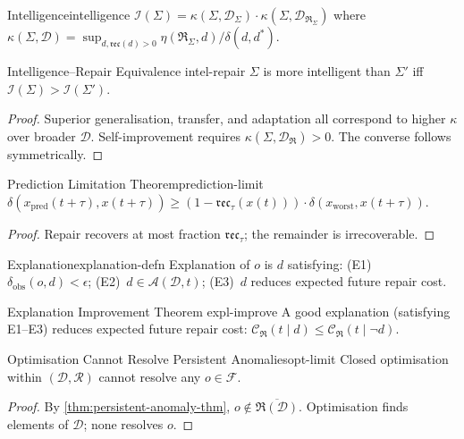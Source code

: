 \documentclass[12pt,twoside,openright]{book}
\newcommand{\adm}{\mathcal{A}}
\newcommand{\repair}{\mathfrak{R}}
\newcommand{\reco}{\mathfrak{rec}}
\begin{document}
\begin{definition}{Intelligence}{intelligence}
  $\mathcal{I}(\Sigma)
  =\kappa(\Sigma,\mathcal{D}_\Sigma)
  \cdot\kappa(\Sigma,\mathcal{D}_{\repair_\Sigma})$
  where $\kappa(\Sigma,\mathcal{D})
  =\sup_{d,\reco(d)>0}
  \eta(\repair_\Sigma,d)/\delta(d,d^*)$.
\end{definition}

\begin{theorem}{Intelligence--Repair Equivalence}%
  {intel-repair}
  $\Sigma$ is more intelligent than $\Sigma'$ iff
  $\mathcal{I}(\Sigma)>\mathcal{I}(\Sigma')$.
\end{theorem}
\begin{proof}
  Superior generalisation, transfer, and adaptation all
  correspond to higher $\kappa$ over broader $\mathcal{D}$.
  Self-improvement requires
  $\kappa(\Sigma,\mathcal{D}_\repair)>0$.
  The converse follows symmetrically.
\end{proof}

\begin{theorem}{Prediction Limitation Theorem}{prediction-limit}
  $\delta(x_\mathrm{pred}(t+\tau),x(t+\tau))
  \ge(1-\reco_\tau(x(t)))\cdot
  \delta(x_\mathrm{worst},x(t+\tau))$.
\end{theorem}
\begin{proof}
  Repair recovers at most fraction $\reco_\tau$;
  the remainder is irrecoverable.
\end{proof}

\begin{definition}{Explanation}{explanation-defn}
  Explanation of $o$ is $d$ satisfying:
  (E1)~$\delta_\mathrm{obs}(o,d)<\epsilon$;
  (E2)~$d\in\adm(\mathcal{D},t)$;
  (E3)~$d$ reduces expected future repair cost.
\end{definition}

\begin{theorem}{Explanation Improvement Theorem}%
  {expl-improve}
  A good explanation (satisfying E1--E3) reduces expected
  future repair cost:
  $\mathcal{C}_\repair(t\mid d)\le
  \mathcal{C}_\repair(t\mid\neg d)$.
\end{theorem}

\begin{proposition}{Optimisation Cannot Resolve Persistent
  Anomalies}{opt-limit}
  Closed optimisation within $(\mathcal{D},\mathcal{R})$
  cannot resolve any $o\in\mathcal{F}$.
\end{proposition}
\begin{proof}
  By \cref{thm:persistent-anomaly-thm},
  $o\notin\overline{\repair(\mathcal{D})}$.
  Optimisation finds elements of $\mathcal{D}$; none
  resolves $o$.
\end{proof}
\end{document}

